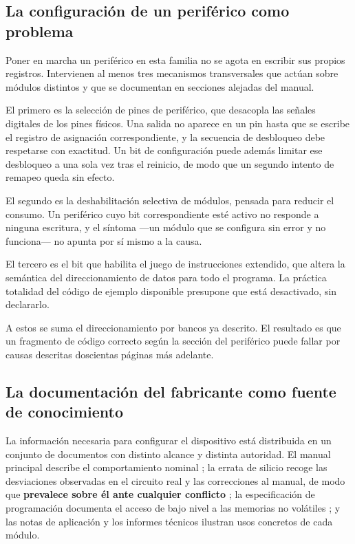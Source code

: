 \subsection{La configuración de un periférico como problema}

Poner en marcha un periférico en esta familia no se agota en escribir sus
propios registros. Intervienen al menos tres mecanismos transversales que actúan
sobre módulos distintos y que se documentan en secciones alejadas del manual.

El primero es la selección de pines de periférico, que desacopla las señales
digitales de los pines físicos. Una salida no aparece en un pin hasta que se
escribe el registro de asignación correspondiente, y la secuencia de
desbloqueo debe respetarse con exactitud. Un bit de configuración puede además
limitar ese desbloqueo a una sola vez tras el reinicio, de modo que un segundo
intento de remapeo queda sin efecto.

El segundo es la deshabilitación selectiva de módulos, pensada para reducir el
consumo. Un periférico cuyo bit correspondiente esté activo no responde a
ninguna escritura, y el síntoma —un módulo que se configura sin error y no
funciona— no apunta por sí mismo a la causa.

El tercero es el bit que habilita el juego de instrucciones extendido, que
altera la semántica del direccionamiento de datos para todo el programa. La
práctica totalidad del código de ejemplo disponible presupone que está
desactivado, sin declararlo.

A estos se suma el direccionamiento por bancos ya descrito. El resultado es que
un fragmento de código correcto según la sección del periférico puede fallar por
causas descritas doscientas páginas más adelante.

\subsection{La documentación del fabricante como fuente de conocimiento}

La información necesaria para configurar el dispositivo está distribuida en un
conjunto de documentos con distinto alcance y distinta autoridad. El manual
principal describe el comportamiento nominal
\cite{microchip2024ds40002043}; la errata de silicio recoge las desviaciones
observadas en el circuito real y las correcciones al manual, de modo que
\textbf{prevalece sobre él ante cualquier conflicto} \cite{microchip2024errata};
la especificación de programación documenta el acceso de bajo nivel a las
memorias no volátiles \cite{microchip2023progspec}; y las notas de aplicación y
los informes técnicos ilustran usos concretos de cada módulo.

